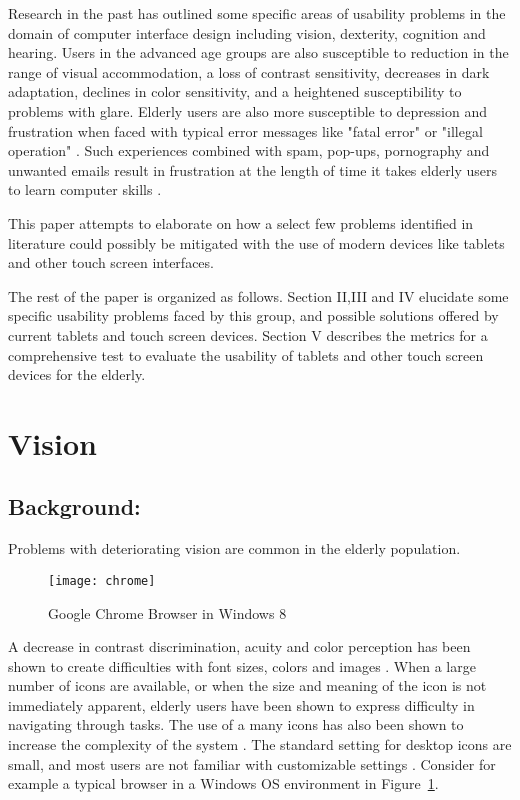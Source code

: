 \documentclass[12pt,draftcls,onecolumn]{IEEEtran}
\begin{document}
  Research in the past has outlined some specific areas of usability problems in the domain of computer interface design including vision, dexterity, cognition and hearing\cite{hanson2001web}. Users in the advanced age groups are also susceptible to reduction in the range of visual accommodation, a loss of contrast sensitivity, decreases in dark adaptation, declines in color sensitivity, and a heightened susceptibility to problems with glare\cite{czaja2002designing}. Elderly users are also more susceptible to depression and frustration when faced with typical error messages like "fatal error" or "illegal operation" \cite{wolf2010elderly}.  Such experiences combined with spam, pop-ups, pornography and unwanted emails result in frustration at the length of time it takes elderly users to learn computer skills \cite{gatto2008computer}. 
  
This paper attempts to elaborate on how a select few problems identified in literature could possibly be mitigated with the use of modern devices like tablets and other touch screen interfaces. 

The rest of the paper is organized as follows. Section II,III and IV elucidate some specific usability problems faced by this group, and possible solutions offered by current tablets and touch screen devices. Section V describes the metrics for a comprehensive test to evaluate the usability of tablets and other touch screen devices for the elderly. 




\section{Vision}

\subsection{Background:} Problems with deteriorating vision are common in the elderly population.
\begin{figure}[!h]
\centering
\texttt{[image: chrome]}
\caption{Google Chrome Browser in Windows 8}
\label{chrome}
\end{figure} 
 A decrease in contrast discrimination, acuity and color perception has been shown to create difficulties with font sizes, colors and images \cite{hanson2001web}. When a large number of icons are available, or when the size and meaning of the icon is not immediately apparent, elderly users have been shown to express difficulty in navigating through tasks. The use of a many icons has also been shown to increase the complexity of the system \cite{czaja1996aging}. The standard setting for desktop icons are small, and most users are not familiar with customizable settings \cite{holzinger2007some}. Consider for example a typical browser in a Windows OS environment in Figure~\ref{chrome}.
\end{document}
